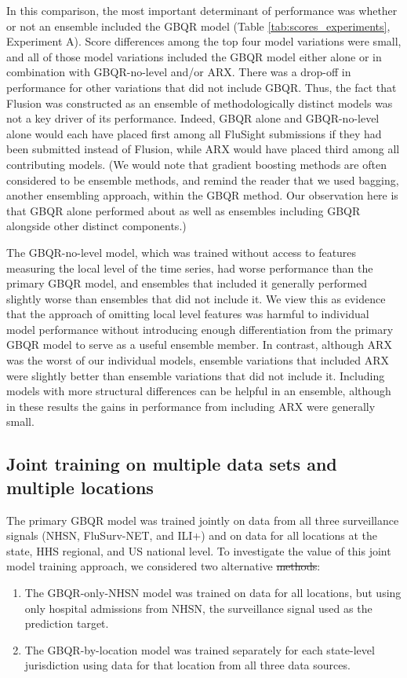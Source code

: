 \documentclass{article}\usepackage[]{graphicx}\usepackage[]{xcolor}
\providecommand{\DIFaddtex}[1]{{\protect\color{blue}\uwave{#1}}} %
\providecommand{\DIFdeltex}[1]{{\protect\color{red}\sout{#1}}}                      %
\providecommand{\DIFaddbegin}{} %
\providecommand{\DIFaddend}{} %
\providecommand{\DIFdelbegin}{} %
\providecommand{\DIFdelend}{} %
\providecommand{\DIFadd}[1]{\texorpdfstring{\DIFaddtex{#1}}{#1}} %
\providecommand{\DIFdel}[1]{\texorpdfstring{\DIFdeltex{#1}}{}} %
\newcommand{\DIFscaledelfig}{0.5}
\newlength{\DIFdelgraphicswidth} %
\newlength{\DIFdelgraphicsheight} %
\newcommand{\DIFaddincludegraphics}[2][]{{\color{blue}\fbox{\DIFOincludegraphics[#1]{#2}}}} %
\newcommand{\DIFdelincludegraphics}[2][]{%
\sbox{\DIFdelgraphicsbox}{\DIFOincludegraphics[#1]{#2}}%
\settoboxwidth{\DIFdelgraphicswidth}{\DIFdelgraphicsbox} %
\settoboxtotalheight{\DIFdelgraphicsheight}{\DIFdelgraphicsbox} %
\scalebox{\DIFscaledelfig}{%
\parbox[b]{\DIFdelgraphicswidth}{\usebox{\DIFdelgraphicsbox}\\[-\baselineskip] \rule{\DIFdelgraphicswidth}{0em}}\llap{\resizebox{\DIFdelgraphicswidth}{\DIFdelgraphicsheight}{%
\setlength{\unitlength}{\DIFdelgraphicswidth}%
\begin{picture}(1,1)%
\thicklines\linethickness{2pt} %
{\color[rgb]{1,0,0}\put(0,0){\framebox(1,1){}}}%
{\color[rgb]{1,0,0}\put(0,0){\line( 1,1){1}}}%
{\color[rgb]{1,0,0}\put(0,1){\line(1,-1){1}}}%
\end{picture}%
}\hspace*{3pt}}} %
} %
\DeclareRobustCommand{\DIFaddbegin}{\DIFOaddbegin \let\includegraphics\DIFaddincludegraphics} %
\DeclareRobustCommand{\DIFaddend}{\DIFOaddend \let\includegraphics\DIFOincludegraphics} %
\DeclareRobustCommand{\DIFdelbegin}{\DIFOdelbegin \let\includegraphics\DIFdelincludegraphics} %
\DeclareRobustCommand{\DIFdelend}{\DIFOaddend \let\includegraphics\DIFOincludegraphics} %
\begin{document}
In this comparison, the most important determinant of performance was whether or not an ensemble included the GBQR model (Table \ref{tab:scores_experiments}, Experiment A). Score differences among the top four model variations were small, and all of those model variations included the GBQR model either alone or in combination with GBQR-no-level and/or ARX. There was a drop-off in performance for other variations that did not include GBQR. Thus, the fact that Flusion was constructed as an ensemble of methodologically distinct models was not a key driver of its performance. Indeed, GBQR alone and GBQR-no-level alone would each have placed first among all FluSight submissions if they had been submitted instead of Flusion, while ARX would have placed third among all contributing models. (We would note that gradient boosting methods are often considered to be ensemble methods, and remind the reader that we used bagging, another ensembling approach, within the GBQR method. Our observation here is that GBQR alone performed about as well as ensembles including GBQR alongside other distinct components.)

The GBQR-no-level model, which was trained without access to features measuring the local level of the time series, had worse performance than the primary GBQR model, and ensembles that included it generally performed slightly worse than ensembles that did not include it. We view this as evidence that the approach of omitting local level features was harmful to individual model performance without introducing enough differentiation from the primary GBQR model to serve as a useful ensemble member. In contrast, although ARX was the worst of our individual models, ensemble variations that included ARX were slightly better than ensemble variations that did not include it. Including models with more structural differences can be helpful in an ensemble, although in these results the gains in performance from including ARX were generally small.

\subsection{Joint training on multiple data sets and multiple locations}

The primary GBQR model was trained jointly on data from all three surveillance signals (NHSN, FluSurv-NET, and ILI+) and on data for all locations at the state, HHS regional, and US national level. To investigate the value of this joint model training approach, we considered two alternative \DIFdelbegin \DIFdel{methods}\DIFdelend \DIFaddbegin \DIFadd{formulations of the GBQR approach}\DIFaddend :
\begin{enumerate}
\item The GBQR-only-NHSN model was trained on data for all locations, but using only hospital admissions from NHSN, the surveillance signal used as the prediction target.
\item The GBQR-by-location model was trained separately for each state-level jurisdiction using data for that location from all three data sources.
\end{enumerate}
\end{document}
